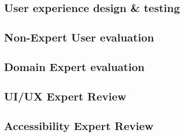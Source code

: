 \documentclass[preview]{standalone}
\begin{document}
\subsection{User experience design \& testing}


\newpage{}
\subsection{Non-Expert User evaluation}


\newpage{}
\subsection{Domain Expert evaluation}


\newpage{}
\subsection{UI/UX Expert Review}


\newpage{}
\subsection{Accessibility Expert Review}

\end{document}
